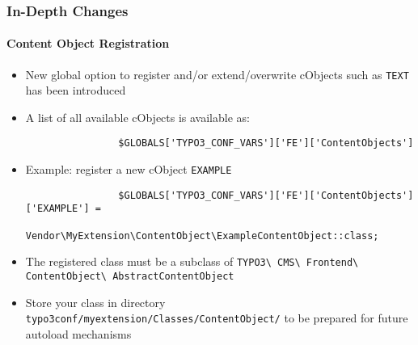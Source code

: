 
\begin{frame}[fragile]
	\frametitle{In-Depth Changes}
	\framesubtitle{Content Object Registration}

	\begin{itemize}

		\item New global option to register and/or extend/overwrite cObjects such as
			\texttt{TEXT} has been introduced

		\item A list of all available cObjects is available as:

			\begin{lstlisting}
				$GLOBALS['TYPO3_CONF_VARS']['FE']['ContentObjects']
			\end{lstlisting}

		\item Example: register a new cObject \texttt{EXAMPLE}

			\begin{lstlisting}
				$GLOBALS['TYPO3_CONF_VARS']['FE']['ContentObjects']['EXAMPLE'] =
				  Vendor\MyExtension\ContentObject\ExampleContentObject::class;
			\end{lstlisting}

		\item The registered class must be a subclass of
			\small
				\texttt{TYPO3\textbackslash
					CMS\textbackslash
					Frontend\textbackslash
					ContentObject\textbackslash
					AbstractContentObject}
			\normalsize

		\item Store your class in directory\newline
			\small
				\texttt{typo3conf/myextension/Classes/ContentObject/}
			\normalsize\newline
			to be prepared for future autoload mechanisms

	\end{itemize}

\end{frame}


